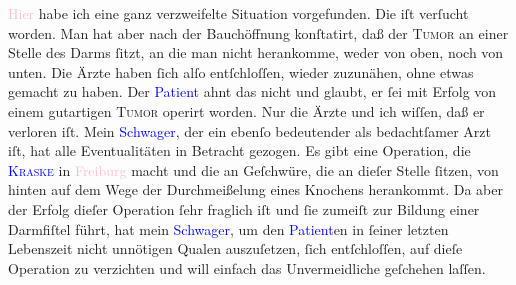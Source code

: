 \pstart
           \textcolor{pink}{Hier}{}\ledrightnote{{$\rightarrow$}\textcolor{pink}{Frankfurt am Main}} habe ich eine ganz
               verzweifelte Situation vorgefunden. Die \label{K-L03243-1v}\label{K-L03243-1h} iſt verſucht worden. Man hat aber nach der Bauchöffnung konſtatirt, daß der
                  \textsc{Tumor} an einer Stelle des Darms ſitzt, an die man nicht
               herankomme, weder von oben, noch von unten. Die Ärzte haben ſich alſo entſchloſſen,
               wieder zuzunähen, ohne etwas gemacht zu haben. Der \textcolor{blue}{Patient}{}\ledrightnote{{$\rightarrow$}\textcolor{blue}{Fedor Mamroth}} ahnt das nicht und glaubt, er ſei
               mit Erfolg von einem gutartigen \textsc{Tumor} operirt worden. Nur
               die Ärzte und ich wiſſen, daß er verloren iſt. {\pb}Mein
                  \textcolor{blue}{Schwager}{}\ledrightnote{{$\rightarrow$}\textcolor{blue}{Josef Rosengart}}, der ein ebenſo
               bedeutender als bedachtſamer Arzt iſt, hat alle Eventualitäten in Betracht gezogen.
               Es gibt eine Operation, die \textsc{\textcolor{blue}{Kraske}{}\ledrightnote{\textcolor{blue}{Paul Kraske}}} in \textcolor{pink}{Freiburg}{}\ledrightnote{\textcolor{pink}{Freiburg im Breisgau}} macht und die an Geſchwüre, die
               an dieſer Stelle ſitzen, von hinten auf dem Wege der Durchmeißelung eines Knochens
               herankommt. Da aber der Erfolg dieſer Operation ſehr fraglich iſt und ſie zumeiſt zur
               Bildung einer Darmfiſtel führt, hat mein \textcolor{blue}{Schwager}{}\ledrightnote{{$\rightarrow$}\textcolor{blue}{Josef Rosengart}}, um den \textcolor{blue}{Patient}{}\ledrightnote{{$\rightarrow$}\textcolor{blue}{Fedor Mamroth}}en in ſeiner letzten Lebenszeit nicht unnötigen Qualen
               auszuſetzen, ſich entſchloſſen, auf dieſe Operation zu verzichten und will einfach
               das Unvermeidliche geſchehen laſſen.\pend
           
